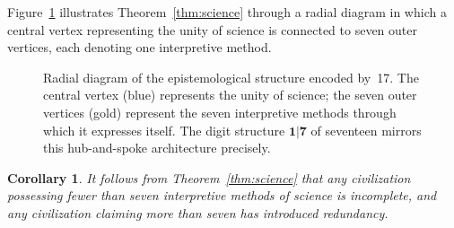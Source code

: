\documentclass[11pt]{article}
\theoremstyle{plain}
\newtheorem{corollary}[theorem]{Corollary}
\theoremstyle{definition}
\theoremstyle{remark}
\begin{document}
Figure~\ref{fig:science} illustrates Theorem~\ref{thm:science} through
a radial diagram in which a central vertex representing the unity of science
is connected to seven outer vertices, each denoting one interpretive method.

\begin{figure}[ht]
\centering
{}
\caption{Radial diagram of the epistemological structure encoded by~17.
The central vertex (blue) represents the unity of science; the seven outer
vertices (gold) represent the seven interpretive methods through which it
expresses itself. The digit structure $\mathbf{1}|\mathbf{7}$ of seventeen
mirrors this hub-and-spoke architecture precisely.}
\label{fig:science}
\end{figure}

\begin{corollary}
It follows from Theorem~\ref{thm:science} that any civilization possessing
fewer than seven interpretive methods of science is incomplete, and any
civilization claiming more than seven has introduced redundancy.
\end{corollary}
\end{document}
